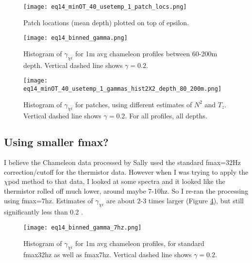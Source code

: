 \documentclass[11pt]{article}
\begin{document}
\begin{figure}[htbp]
\texttt{[image: eq14\_minOT\_40\_usetemp\_1\_patch\_locs.png]}
\caption{Patch locations (mean depth) plotted on top of epsilon.}
\label{}
\end{figure}


\begin{figure}[htbp]
\texttt{[image: eq14\_binned\_gamma.png]}
\caption{Histogram of $\gamma_{\chi\epsilon}$ for 1m avg chameleon profiles between 60-200m depth. Vertical dashed line shows $\gamma=0.2$.}
\label{avggam}
\end{figure}

\begin{figure}[htbp]
\texttt{[image: eq14\_minOT\_40\_usetemp\_1\_gammas\_hist2X2\_depth\_80\_200m.png]}
\caption{Histogram of $\gamma_{\chi\epsilon}$ for patches, using different estimates of $N^2$ and $T_z$. Vertical dashed line shows $\gamma=0.2$. For all profiles, all depths.}
\label{patchgam}
\end{figure}


\clearpage
\subsection{Using smaller fmax?}

I believe the Chameleon data processed by Sally used the standard fmax=32Hz correction/cutoff for the thermistor data. However when I was trying to apply the $\chi$pod method to that data, I looked at some spectra and it looked like the thermistor rolled off much lower, around maybe 7-10hz. So I re-ran the processing using fmax=7hz. Estimates of $\gamma_{\chi\epsilon}$ are about 2-3 times larger (Figure \ref{avggam7hz}), but still significantly less than 0.2 .

\begin{figure}[htbp]
\texttt{[image: eq14\_binned\_gamma\_7hz.png]}
\caption{Histogram of $\gamma_{\chi\epsilon}$ for 1m avg chameleon profiles, for standard fmax32hz as well as fmax7hz. Vertical dashed line shows $\gamma=0.2$.}
\label{avggam7hz}
\end{figure}
\end{document}
